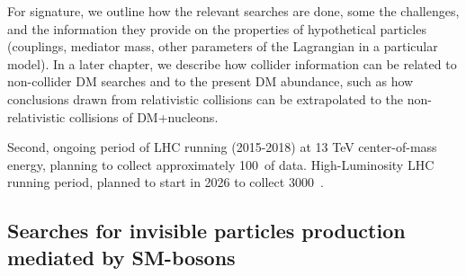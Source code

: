 For signature, we outline how the relevant searches are done, some the challenges, and the information they provide on the properties of hypothetical particles (couplings, mediator mass, other parameters of the Lagrangian in a particular model). 
In a later chapter, we describe how collider information can be related to non-collider DM searches and to the present DM abundance, such as how conclusions drawn from relativistic collisions can be extrapolated to the non-relativistic collisions of DM+nucleons. 

\begin{marginnote}[]
 {Second, ongoing period of LHC running (2015-2018) at 13 TeV center-of-mass energy, planning to collect approximately 100~\ifb of data.}
 {High-Luminosity LHC running period, planned to start in 2026 to collect 3000~\ifb.}
\end{marginnote}


\subsection{Searches for invisible particles production mediated by SM-bosons}
\label{sec:results_ZHSearches}

